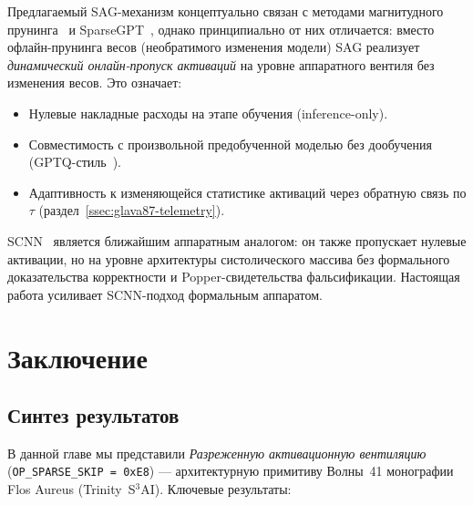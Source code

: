 Предлагаемый SAG-механизм концептуально связан с методами
магнитудного прунинга~\cite{han2015deepcompression} и
SparseGPT~\cite{zhang2022sparsegpt}, однако принципиально
от них отличается: вместо офлайн-прунинга весов (необратимого
изменения модели) SAG реализует \emph{динамический онлайн-пропуск
активаций} на уровне аппаратного вентиля без изменения весов.
Это означает:
\begin{itemize}
  \item Нулевые накладные расходы на этапе обучения (inference-only).
  \item Совместимость с произвольной предобученной моделью
        без дообучения (GPTQ-стиль~\cite{frantar2022gptq}).
  \item Адаптивность к изменяющейся статистике активаций
        через обратную связь по $\tau$ (раздел~\ref{ssec:glava87-telemetry}).
\end{itemize}

SCNN~\cite{parashar2017scnn} является ближайшим аппаратным
аналогом: он также пропускает нулевые активации, но на уровне
архитектуры систолического массива без формального доказательства
корректности и Popper-свидетельства фальсификации.
Настоящая работа усиливает SCNN-подход формальным аппаратом.

\section{Заключение}
\label{sec:glava87-conclusion}

\subsection{Синтез результатов}
\label{ssec:glava87-synthesis}

В данной главе мы представили \emph{Разреженную активационную вентиляцию}
(\texttt{OP\_SPARSE\_SKIP = 0xE8}) — архитектурную примитиву Волны~41
монографии Flos Aureus (Trinity~S$^3$AI).  Ключевые результаты:

